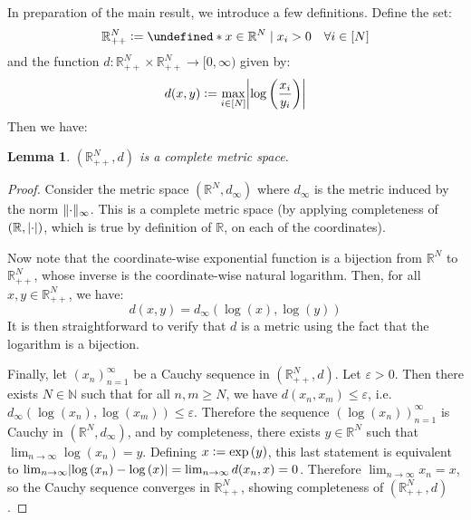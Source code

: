 \documentclass{article}
\theoremstyle{plain}
\newtheorem{lemma}{Lemma}
\theoremstyle{definition}
\theoremstyle{remark}
\newcommand{\defeq}{\vcentcolon=}
\let\brace\undefined
\DeclarePairedDelimiter{\brace}{\lbrace}{\rbrace}
\newcommand{\eps}{\varepsilon}
\newcommand{\N}{\mathbb{N}}
\newcommand{\R}{\mathbb{R}}
\newcommand{\logp}[1]{\log{\left(#1\right)}}
\DeclarePairedDelimiter{\abs}{\lvert}{\rvert}
\DeclarePairedDelimiter{\norm}{\lVert}{\rVert}
\begin{document}
In preparation of the main result, we introduce a few definitions. Define the set:
\begin{equation*}
    \R_{++}^{N} \defeq \brace*{x \in \R^{N} \mid x_i > 0 \quad \forall i \in [N]}
\end{equation*}
and the function $d: \R_{++}^{N} \times \R_{++}^{N} \to [0, \infty)$ given by:
\begin{equation*}
    d(x, y) \defeq \max_{i \in [N]} \abs*{\logp{\frac{x_i}{y_i}}} 
\end{equation*}
Then we have:
\begin{lemma}
\label{lem:6}
    $(\R_{++}^{N}, d)$ is a complete metric space.
\end{lemma}
\begin{proof}
    Consider the metric space $(\R^{N}, d_{\infty})$ where $d_{\infty}$ is the metric induced by the norm $\norm{\cdot}_{\infty}$. This is a complete metric space (by applying completeness of $(\R, \abs{\cdot})$, which is true by definition of $\R$, on each of the coordinates).
    
    Now note that the coordinate-wise exponential function is a bijection from $\R^{N}$ to $\R_{++}^{N}$, whose inverse is the coordinate-wise natural logarithm. Then, for all $x, y \in \R_{++}^{N}$, we have:
    \begin{equation*}
        d(x, y) = d_{\infty}(\logp{x}, \logp{y})
    \end{equation*}
    It is then straightforward to verify that $d$ is a metric using the fact that the logarithm is a bijection. 
    
    Finally, let $(x_n)_{n=1}^{\infty}$ be a Cauchy sequence in $(\R^{N}_{++}, d)$. Let $\eps > 0$. Then there exists $N \in \N$ such that for all $n, m \geq N$, we have $d(x_n, x_m) \leq \eps$, i.e. $d_{\infty}(\logp{x_n}, \logp{x_m}) \leq \eps$. Therefore the sequence $(\logp{x_n})_{n=1}^{\infty}$ is Cauchy in $(\R^{N}, d_{\infty})$, and by completeness, there exists $y \in \R^{N}$ such that $\lim_{n \to \infty} \logp{x_n} = y$. Defining $x \defeq \exp{(y)}$, this last statement is equivalent to $\lim_{n \to \infty} \abs{\logp{x_n} - \logp{x}} = \lim_{n \to \infty} d(x_n, x) = 0$. Therefore $\lim_{n \to \infty} x_n = x$, so the Cauchy sequence converges in $\R_{++}^{N}$, showing completeness of $(\R^{N}_{++}, d)$. 
\end{proof}
\end{document}
